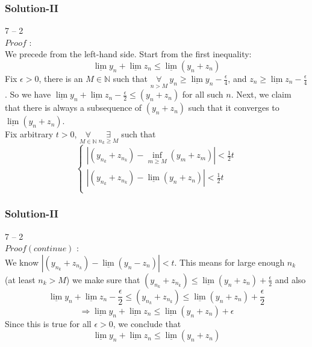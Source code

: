 \documentclass[12pt, t]{beamer}
\begin{document}
\begin{frame}
    \frametitle{Solution-II}
    7 -- 2\\
    $Proof$ : \\
    \hspace{1em} We precede from the left-hand side. Start from the first inequality:
    \begin{equation*}
        \underline{\lim}y_n+\underline{\lim}z_n\leq \underline{\lim} (y_n+z_n)
    \end{equation*}
    \hspace{1em} Fix $\epsilon>0$, there is an $M\in \mathbb{N}$ such that $\underset{n>M}{\forall}\ y_n\geq \underline{\lim}y_n-\frac{\epsilon}{4}$, and
    $z_n \geq \underline{\lim}z_n-\frac{\epsilon}{4}$. So we have $\underline{\lim}y_n+\underline{\lim}z_n-\frac{\epsilon}{2}\leq(y_n+z_n)$ for all such $n$.
    Next, we claim that there is always a subsequence of $(y_n+z_n)$ such that it converges to $\underline{\lim}(y_n+z_n)$.\\
    \hspace{1em} Fix arbitrary $t>0$, $\underset{M\in\mathbb{N}}{\forall}\ \underset{n_k\geq M}{\exists}$ such that
    \begin{equation*}
        \begin{cases}
            |(y_{n_k}+z_{n_k})-\inf_{m\geq M}(y_m+z_m)|<\frac{1}{2}t   \\
            |(y_{n_k}+z_{n_k})-\underline{\lim}(y_n+z_n)|<\frac{1}{2}t \\
        \end{cases}
    \end{equation*}


\end{frame}

\begin{frame}
    \frametitle{Solution-II}
    7 -- 2\\
    $Proof(continue)$ : \\
    \hspace{1em} We know $|(y_{n_k}+z_{n_k})-\underline{\lim}(y_n-z_n)|<t$. This means for large enough $n_k$ (at least $n_k>M$) we make sure that
    $(y_{n_k}+z_{n_k})\leq \underline{\lim}(y_n+z_n)+\frac{\epsilon}{2}$ and also
    \begin{equation*}
        \underline{\lim}y_n+\underline{\lim}z_n-\frac{\epsilon}{2}\leq (y_{n_k}+z_{n_k})\leq \underline{\lim}(y_n+z_n)+\frac{\epsilon}{2}
    \end{equation*}
    \begin{equation*}
        \Rightarrow \underline{\lim}y_n+\underline{\lim}z_n\leq \underline{\lim}(y_n+z_n)+\epsilon
    \end{equation*}
    \hspace{1em} Since this is true for all $\epsilon>0$, we conclude that
    \begin{equation*}
        \underline{\lim}y_n+\underline{\lim}z_n\leq \underline{\lim}(y_n+z_n)
    \end{equation*}

\end{frame}
\end{document}
